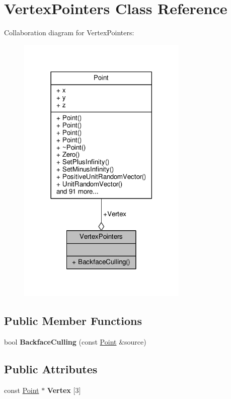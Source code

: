 \hypertarget{structVertexPointers}{}\section{Vertex\+Pointers Class Reference}
\label{structVertexPointers}


Collaboration diagram for Vertex\+Pointers\+:
\nopagebreak
\begin{figure}[H]
\begin{center}
\leavevmode
\includegraphics[width=230pt]{d9/d32/structVertexPointers__coll__graph}
\end{center}
\end{figure}
\subsection*{Public Member Functions}
\begin{DoxyCompactItemize}
\item 
bool {\bfseries Backface\+Culling} (const \hyperlink{classPoint}{Point} \&source)\hypertarget{structVertexPointers_a676a8fd54ec43844508eb1ff5bc11325}{}\label{structVertexPointers_a676a8fd54ec43844508eb1ff5bc11325}

\end{DoxyCompactItemize}
\subsection*{Public Attributes}
\begin{DoxyCompactItemize}
\item 
const \hyperlink{classPoint}{Point} $\ast$ {\bfseries Vertex} \mbox{[}3\mbox{]}\hypertarget{structVertexPointers_aa09a8651245010b416eac5bdb1bbeeb5}{}\label{structVertexPointers_aa09a8651245010b416eac5bdb1bbeeb5}

\end{DoxyCompactItemize}



